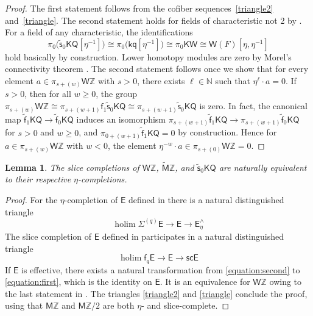 \documentclass[11pt,hyp,english]{article}
\newcommand{\E}{\mathsf{E}}
\newcommand{\Z}{\mathbb{Z}}
\newcommand{\KQ}{\mathsf{KQ}}
\newcommand{\KW}{\mathsf{KW}}
\newcommand{\kq}{\mathsf{kq}}
\newcommand{\MZ}{\mathsf{M}\Z}
\newcommand{\cHZ}{\wt{{\mathsf{M}}}{\Z}}
\newcommand{\HWZ}{\mathsf{W}\Z}
\newcommand{\holim}{\operatorname{holim}}
\newcommand{\wt}[1]{\widetilde{#1}}
\newcommand{\vs}{\tilde{\mathsf{s}}}
\newcommand{\f}{\mathsf{f}}
\newcommand{\vf}{\tilde{{\mathsf{f}}}}
\renewcommand{\sc}{\mathsf{sc}}
\let\smash=\wedge
\newtheorem{lemma}[theorem]{Lemma}
\theoremstyle{definition}
\begin{document}
\begin{proof}
The first statement follows from the cofiber sequences~\eqref{triangle2} and~\eqref{triangle}.
The second statement holds for fields of characteristic not 2 by \cite[Theorem 17]{Bachmann}.
For a field of any characteristic, the identifications 
\[ \pi_0\bigl(\vs_0\KQ[\eta^{-1}]\bigr)\cong \pi_0\bigl(\kq[\eta^{-1}]\bigr)\cong \pi_0\KW \cong \mathsf{W}(F)[\eta,\eta^{-1}]\] 
hold basically by construction.
Lower homotopy modules are zero by Morel's connectivity theorem \cite{morel.connectivity}.
The second statement follows once we show that for every element $a\in \pi_{s+(w)}\HWZ$ with $s>0$, there exists $\ell\in \mathbb{N}$ such that $\eta^\ell \cdot a=0$. If $s>0$, then for all $w\ge 0$,
the group $\pi_{s+(w)}\HWZ\cong \pi_{s+(w+1)}\f_1\vs_0\KQ\cong \pi_{s+(w+1)}\vs_0\KQ$ is zero.
In fact, the canonical map $\vf_1\KQ\to \vf_0\KQ$ induces an isomorphism $\pi_{s+(w+1)}\vf_1\KQ\to \pi_{s+(w+1)}\vf_0\KQ$ for $s>0$ and $w\geq 0$, and $\pi_{0+(w+1)}\vf_1\KQ=0$ by construction. 
Hence for $a\in \pi_{s+(w)}\HWZ$ with $w<0$, the element $\eta^{-w}\cdot a \in \pi_{s+(0)}\HWZ=0$.
\end{proof}

\begin{lemma}
\label{lem:convergence-v}
The slice completions of $\HWZ$, $\cHZ$, and $\vs_{0}\KQ $ 
are naturally equivalent to their respective $\eta$-completions.
\end{lemma}

\begin{proof}
For the $\eta$-completion of $\E$ defined in \cite[§2]{zbMATH06957413} there is a natural distinguished triangle
\begin{equation}
\label{equation:second}
\holim \Sigma^{(q)}\E  \to \E\to \E^\wedge_\eta 
\end{equation}
The slice completion of $\E$ defined in \cite[(3.10)]{zbMATH06957413} 
participates in a natural distinguished triangle
\begin{equation}
\label{equation:first}
\holim \f_{q}\E  \to \E\to \sc\E  
\end{equation}
If $\E$ is effective, there exists a natural transformation from \eqref{equation:second} to \eqref{equation:first}, which is the identity on $\E$. 
It is an equivalence for $\HWZ$ owing to the last statement in .
The triangles \eqref{triangle2} and \eqref{triangle} conclude the proof, using that $\MZ$ and $\MZ/2$ are both $\eta$- and slice-complete.
\end{proof}
\end{document}
